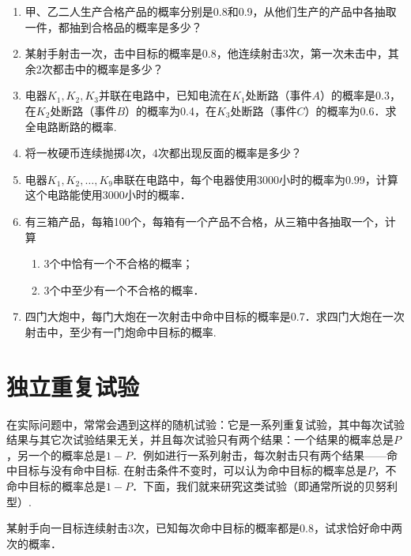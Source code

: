 \begin{enumerate}
    \item 甲、乙二人生产合格产品的概率分别是0.8和0.9，从他们生产的产品中各抽取一件，都抽到合格品的概率是多少？
    \item 某射手射击一次，击中目标的概率是0.8，他连续射击3次，第一次未击中，其余2次都击中的概率是多少？
    \item 电器$K_1,K_2,K_3$并联在电路中，已知电流在$K_1$处断路（事件$A$）的概率是0.3，在$K_2$处断路（事件$B$）的概率为0.4，在$K_3$处断路（事件$C$）的概率为0.6．求全电路断路的概率.
    \item 将一枚硬币连续抛掷4次，4次都出现反面的概率是多少？
    \item 电器$K_1,K_2,\ldots,K_9$串联在电路中，每个电器使用3000小时的概率为0.99，计算这个电路能使用3000小时的概率．
    \item 有三箱产品，每箱100个，每箱有一个产品不合格，从三箱中各抽取一个，计算
\begin{enumerate}[(1)]
    \item 3个中恰有一个不合格的概率；
    \item 3个中至少有一个不合格的概率．
\end{enumerate}
\item 四门大炮中，每门大炮在一次射击中命中目标的概率是0.7．求四门大炮在一次射击中，至少有一门炮命中目标的概率.
\end{enumerate}

\section{独立重复试验}
在实际问题中，常常会遇到这样的随机试验：它是一系列重复试验，其中每次试验结果与其它次试验结果无关，并且每次试验只有两个结果：一个结果的概率总是$P$，另一个的概率总是$1-P$．例如进行一系列射击，每次射击只有两个结果——命中目标与没有命中目标. 在射击条件不变时，可以认为命中目标的概率总是$P$，不命中目标的概率总是$1-P$．下面，我们就来研究这类试验（即通常所说的贝努利型）.

\begin{example}
某射手向一目标连续射击3次，已知每次命中目标的概率都是0.8，试求恰好命中两次的概率．    
\end{example}

